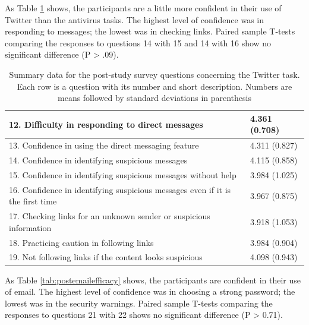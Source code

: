 As Table \ref{tab:posttwitefficacy} shows, the participants are a little more confident in their use of Twitter than the antivirus tasks. The highest level of confidence was in responding to messages; the lowest was in checking links. Paired sample T-tests comparing the responses to questions 14 with 15 and 14 with 16 show no significant difference (P > .09).
\begin{table}[ht]
\begin{tabular}{|ll|}
\hline
12. Difficulty in responding to direct messages         & 4.361 (0.708) \\ \hline
13. Confidence in using the direct messaging feature    & 4.311 (0.827) \\ \hline
14. Confidence in identifying suspicious messages       & 4.115 (0.858) \\ \hline
15. Confidence in identifying suspicious messages without help                 & 3.984 (1.025) \\ \hline
16. Confidence in identifying suspicious messages even if it is the first time & 3.967 (0.875) \\ \hline
17. Checking links for an unknown sender or suspicious information             & 3.918 (1.053) \\ \hline
18. Practicing caution in following links               & 3.984 (0.904) \\ \hline
19. Not following links if the content looks suspicious & 4.098 (0.943) \\ \hline
\end{tabular}
\caption{Summary data for the post-study survey questions concerning the Twitter task. Each
row is a question with its number and short description. Numbers are means followed by standard deviations in parenthesis}
\label{tab:posttwitefficacy}
\end{table}

As Table \ref{tab:postemailefficacy} shows, the participants are confident in their use of email. The highest level of confidence was in choosing a strong password; the lowest was in the security warnings. Paired sample T-tests comparing the responses to questions 21 with 22 shows no significant difference (P > 0.71).

